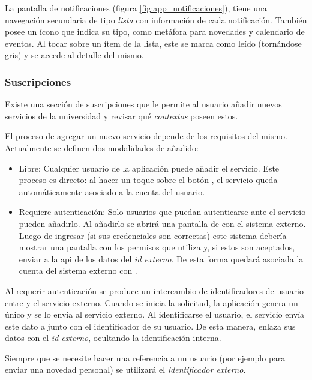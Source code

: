 
La pantalla de notificaciones (figura \ref{fig:app_notificaciones}), tiene una navegación secundaria de tipo \textit{lista} con información de cada notificación. También posee un ícono que indica su tipo, como metáfora para novedades y calendario de eventos. Al tocar sobre un ítem de la lista, este se marca como leído (tornándose gris) y se accede al detalle del mismo.

\subsubsection{Suscripciones}
\label{funcionalidad_suscripciones}

Existe una sección de suscripciones que le permite al usuario añadir nuevos servicios de la universidad y revisar qué \textit{contextos} poseen estos.

El proceso de agregar un nuevo servicio depende de los requisitos del mismo. Actualmente se definen dos modalidades de añadido:
\begin{itemize}
\item Libre: Cualquier usuario de la aplicación puede añadir el servicio. Este proceso es directo: al hacer un toque sobre el botón , el servicio queda automáticamente asociado a la cuenta del usuario.
\item Requiere autenticación: Solo usuarios que puedan autenticarse ante el servicio pueden añadirlo. Al añadirlo se abrirá una pantalla de  con el sistema externo. Luego de ingresar (si sus credenciales son correctas) este sistema debería mostrar una pantalla con los permisos que utiliza y, si estos son aceptados, enviar a la \gls{api} de \nombreApp{} los datos del \textit{id externo}. De esta forma quedará asociada la cuenta del sistema externo con \nombreApp{}. 
\end{itemize}

Al requerir autenticación se produce un intercambio de identificadores de usuario entre \nombreApp{} y el servicio externo. Cuando se inicia la solicitud, la aplicación genera un  único y se lo envía al servicio externo. Al identificarse el usuario, el servicio envía este dato a \nombreApp{} junto con el identificador de su usuario. De esta manera, \nombreApp enlaza sus datos con el \textit{id externo}, ocultando la identificación interna.

Siempre que se necesite hacer una referencia a un usuario (por ejemplo para enviar una novedad personal) se utilizará el \textit{identificador externo}.

